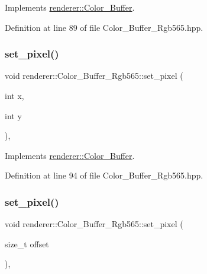 Implements \mbox{\hyperlink{classrenderer_1_1_color___buffer_ac99a897d15211d3754e343928412b765}{renderer\+::\+Color\+\_\+\+Buffer}}.



Definition at line 89 of file Color\+\_\+\+Buffer\+\_\+\+Rgb565.\+hpp.

\mbox{\label{classrenderer_1_1_color___buffer___rgb565_ab3f0706720c48f42cbc8aa771ea3178e}} 
\subsubsection{\texorpdfstring{set\_pixel()}{set\_pixel()}\hspace{0.1cm}{\footnotesize\ttfamily [1/2]}}
{\footnotesize\ttfamily void renderer\+::\+Color\+\_\+\+Buffer\+\_\+\+Rgb565\+::set\+\_\+pixel (\begin{DoxyParamCaption}\item[{int}]{x,  }\item[{int}]{y }\end{DoxyParamCaption})\hspace{0.3cm}{\ttfamily [inline]}, {\ttfamily [virtual]}}



Implements \mbox{\hyperlink{classrenderer_1_1_color___buffer_a383c851cb75200d8924857b1b28a675e}{renderer\+::\+Color\+\_\+\+Buffer}}.



Definition at line 94 of file Color\+\_\+\+Buffer\+\_\+\+Rgb565.\+hpp.

\mbox{\label{classrenderer_1_1_color___buffer___rgb565_af07fc1066c1654ed887952db87a8869a}} 
\subsubsection{\texorpdfstring{set\_pixel()}{set\_pixel()}\hspace{0.1cm}{\footnotesize\ttfamily [2/2]}}
{\footnotesize\ttfamily void renderer\+::\+Color\+\_\+\+Buffer\+\_\+\+Rgb565\+::set\+\_\+pixel (\begin{DoxyParamCaption}\item[{size\+\_\+t}]{offset }\end{DoxyParamCaption})\hspace{0.3cm}{\ttfamily [inline]}, {\ttfamily [virtual]}}



